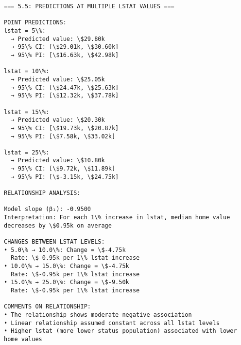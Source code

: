 \documentclass[11pt, twocolumn]{article}
\begin{document}
    \begin{Verbatim}[commandchars=\\\{\}]
=== 5.5: PREDICTIONS AT MULTIPLE LSTAT VALUES ===

POINT PREDICTIONS:
lstat = 5\%:
  → Predicted value: \$29.80k
  → 95\% CI: [\$29.01k, \$30.60k]
  → 95\% PI: [\$16.63k, \$42.98k]

lstat = 10\%:
  → Predicted value: \$25.05k
  → 95\% CI: [\$24.47k, \$25.63k]
  → 95\% PI: [\$12.32k, \$37.78k]

lstat = 15\%:
  → Predicted value: \$20.30k
  → 95\% CI: [\$19.73k, \$20.87k]
  → 95\% PI: [\$7.58k, \$33.02k]

lstat = 25\%:
  → Predicted value: \$10.80k
  → 95\% CI: [\$9.72k, \$11.89k]
  → 95\% PI: [\$-3.15k, \$24.75k]

RELATIONSHIP ANALYSIS:

Model slope (β₁): -0.9500
Interpretation: For each 1\% increase in lstat, median home value
decreases by \$0.95k on average

CHANGES BETWEEN LSTAT LEVELS:
• 5.0\% → 10.0\%: Change = \$-4.75k
  Rate: \$-0.95k per 1\% lstat increase
• 10.0\% → 15.0\%: Change = \$-4.75k
  Rate: \$-0.95k per 1\% lstat increase
• 15.0\% → 25.0\%: Change = \$-9.50k
  Rate: \$-0.95k per 1\% lstat increase

COMMENTS ON RELATIONSHIP:
• The relationship shows moderate negative association
• Linear relationship assumed constant across all lstat levels
• Higher lstat (more lower status population) associated with lower home values
    \end{Verbatim}

    \begin{center}
    \end{center}
    { \hspace*{\fill} \\}
    
\end{document}

